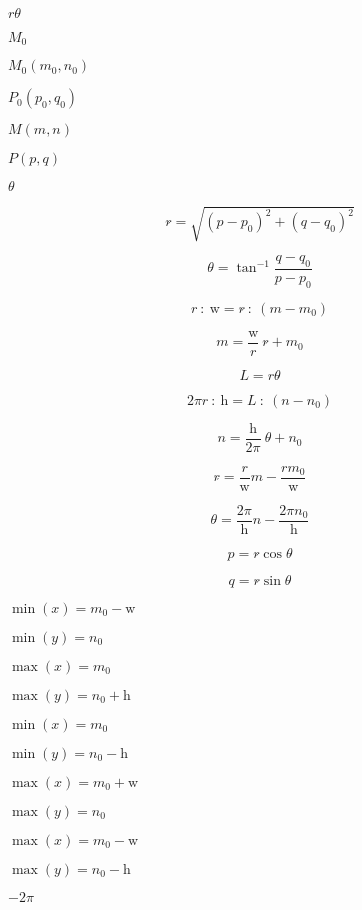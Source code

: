 \documentclass{article}
\begin{document}
{$r\theta$
\pagebreak

$M_{0}$
\pagebreak

$M_{0}\left(m_{0},n_{0}\right)$
\pagebreak

$P_{0}\left(p_{0},q_{0}\right)$
\pagebreak

$M\left(m,n\right)$
\pagebreak

$P\left(p,q\right)$
\pagebreak

$\theta\acute{}$
\pagebreak

\[ r\acute{} = \sqrt{\left(p-p_{0}\right)^2+\left(q-q_{0}\right)^2} \]
\pagebreak

\[ \theta\acute{} = \tan^{-1} \frac{q-q_{0}}{p-p_{0}} \]
\pagebreak

\[ r\ :\ \text{w} = r\acute{}\ :\ \left(m-m_{0}\right) \]
\pagebreak

\[ m = \frac{\text{w}}{r}\ r\acute{}+m_{0} \]
\pagebreak

\[ L = r\theta\acute{} \]
\pagebreak

\[ 2\pi r\ :\ \text{h} = L\ :\ \left(n-n_{0}\right) \]
\pagebreak

\[ n = \frac{\text{h}}{2\pi}\ \theta\acute{}+n_{0} \]
\pagebreak

\[ r\acute{} = \frac{r}{\text{w}}m-\frac{rm_{0}}{\text{w}} \]
\pagebreak

\[ \theta\acute{} = \frac{2\pi}{\text{h}}n-\frac{2\pi n_{0}}{\text{h}} \]
\pagebreak

\[ p = r\acute{}\cos \theta\acute{} \]
\pagebreak

\[ q = r\acute{}\sin \theta\acute{} \]
\pagebreak

$\min\left(x\right) = m_{0} - \textrm{w}$
\pagebreak

$\min\left(y\right) = n_{0}$
\pagebreak

$\max\left(x\right) = m_{0}$
\pagebreak

$\max\left(y\right) = n_{0} + \textrm{h}$
\pagebreak

$\min\left(x\right) = m_{0}$
\pagebreak

$\min\left(y\right) = n_{0} - \textrm{h}$
\pagebreak

$\max\left(x\right) = m_{0} + \textrm{w}$
\pagebreak

$\max\left(y\right) = n_{0}$
\pagebreak

$\max\left(x\right) = m_{0} - \textrm{w}$
\pagebreak

$\max\left(y\right) = n_{0} - \textrm{h}$
\pagebreak

$-2\pi$
\pagebreak

}
\end{document}
